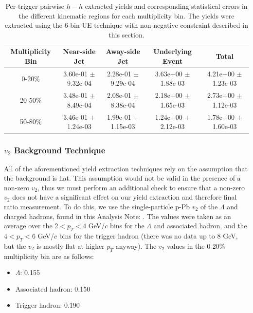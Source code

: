 \documentclass[ALICE,manyauthors]{ALICE_analysis_notes}
\begin{document}
\begin{table}[h!]
\centering
\begin{tabular}{| c | c | c | c | c | }
\hline
Multiplicity Bin & Near-side Jet & Away-side Jet & Underlying Event & Total  \\
\hline

0-20\% & 3.60e-01 $\pm$ 9.32e-04 & 2.28e-01 $\pm$ 9.29e-04 & 3.63e+00 $\pm$ 1.88e-03 & 4.21e+00 $\pm$ 1.23e-03 \\
20-50\% & 3.48e-01 $\pm$ 8.49e-04 & 2.08e-01 $\pm$ 8.38e-04 & 2.18e+00 $\pm$ 1.65e-03 & 2.73e+00 $\pm$ 1.12e-03 \\
50-80\% & 3.46e-01 $\pm$ 1.24e-03 & 1.99e-01 $\pm$ 1.15e-03 & 1.24e+00 $\pm$ 2.12e-03 & 1.78e+00 $\pm$ 1.60e-03 \\

\hline
\end{tabular}
\caption{Per-trigger pairwise $h-h$ extracted yields and corresponding statistical errors in the different kinematic regions for each multiplicity bin. The yields were extracted using the 6-bin UE technique with non-negative constraint described in this section.}
\label{h_h_yield_table_6bin_nonzero}
\end{table}

\subsubsection{$v_{2}$ Background Technique}
All of the aforementioned yield extraction techniques rely on the assumption that the background is flat. This assumption would not be valid in the presence of a non-zero $v_{2}$, thus we must perform an additional check to ensure that a non-zero $v_{2}$ does not have a significant effect on our yield extraction and therefore final ratio measurement. To do this, we use the single-particle p-Pb $v_{2}$ of the $\Lambda$ and charged hadrons, found in this Analysis Note: \cite{ANALYSIS_NOTE_V2}. The values were taken as an average over the $2 < p_{T} < 4$ GeV/$c$ bins for the $\Lambda$ and associated hadron, and the $4 < p_{T} < 6$ GeV/$c$ bins for the trigger hadron (there was no data up to 8 GeV, but the $v_{2}$ is mostly flat at higher $p_{T}$ anyway). The $v_{2}$ values in the 0-20\% multiplicity bin are as follows:

\begin{itemize}
\item $\Lambda$: 0.155
\item Associated hadron: 0.150
\item Trigger hadron: 0.190
\end{itemize}
\end{document}
